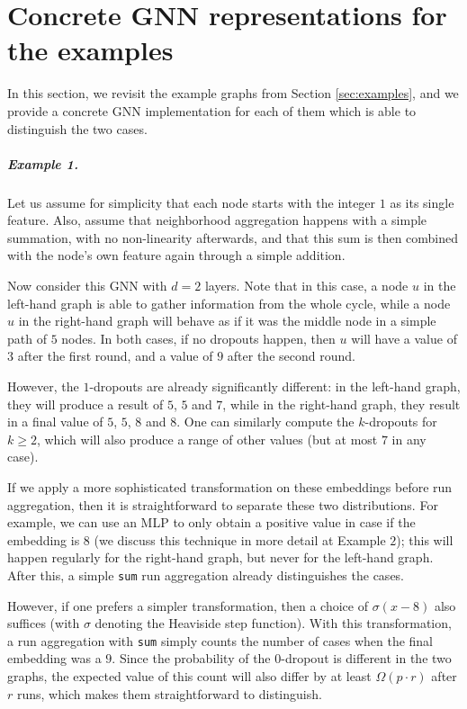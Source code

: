 \documentclass{article}
\begin{document}




\newpage
\appendix

\section{Concrete GNN representations for the examples} \label{app:examples}

In this section, we revisit the example graphs from Section \ref{sec:examples}, and we provide a concrete GNN implementation for each of them which is able to distinguish the two cases.

\subparagraph*{Example 1.} Let us assume for simplicity that each node starts with the integer $1$ as its single feature. Also, assume that neighborhood aggregation happens with a simple summation, with no non-linearity afterwards, and that this sum is then combined with the node's own feature again through a simple addition.

Now consider this GNN with $d=2$ layers. Note that in this case, a node $u$ in the left-hand graph is able to gather information from the whole cycle, while a node $u$ in the right-hand graph will behave as if it was the middle node in a simple path of $5$ nodes. In both cases, if no dropouts happen, then $u$ will have a value of $3$ after the first round, and a value of $9$ after the second round.

However, the $1$-dropouts are already significantly different: in the left-hand graph, they will produce a result of $5$, $5$ and $7$, while in the right-hand graph, they result in a final value of $5$, $5$, $8$ and $8$. One can similarly compute the $k$-dropouts for $k \geq 2$, which will also produce a range of other values (but at most $7$ in any case).

If we apply a more sophisticated transformation on these embeddings before run aggregation, then it is straightforward to separate these two distributions. For example, we can use an MLP to only obtain a positive value in case if the embedding is $8$ (we discuss this technique in more detail at Example $2$); this will happen regularly for the right-hand graph, but never for the left-hand graph. After this, a simple \texttt{sum} run aggregation already distinguishes the cases.

However, if one prefers a simpler transformation, then a choice of $\sigma(x-8)$ also suffices (with $\sigma$ denoting the Heaviside step function). With this transformation, a run aggregation with \texttt{sum} simply counts the number of cases when the final embedding was a $9$. Since the probability of the $0$-dropout is different in the two graphs, the expected value of this count will also differ by at least $\Omega(p \cdot r)$ after $r$ runs, which makes them straightforward to distinguish.
\end{document}
